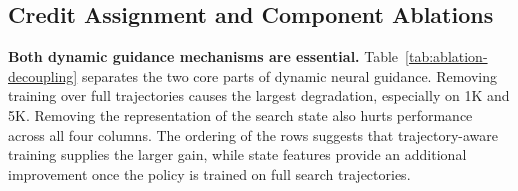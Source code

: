 \begin{table}[h]
\centering
\small
\renewcommand{\arraystretch}{0.85}
\caption{Comparison with neural-guided ACO methods at their maximum reported scale. HeatACO~\cite{heataco} combines ACO with other pretrained heatmap models~\cite{attgcn, dimes, utsp, difusco}.}
\label{tab:neural-aco}
\end{table}

\subsection{Credit Assignment and Component Ablations}
\label{sec:ablations}

\smallskip\noindent\textbf{Both dynamic guidance mechanisms are essential.}
Table~\ref{tab:ablation-decoupling} separates the two core parts of dynamic neural guidance. Removing training over full trajectories causes the largest degradation, especially on \TSP{}1K and \TSP{}5K. Removing the representation of the search state also hurts performance across all four columns. The ordering of the rows suggests that trajectory-aware training supplies the larger gain, while state features provide an additional improvement once the policy is trained on full search trajectories.

